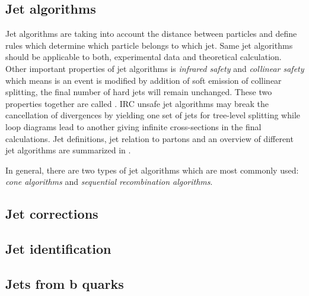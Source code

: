 
\subsection{Jet algorithms}

Jet algorithms are taking into account the distance between particles and define rules which determine which particle belongs to which jet. Same jet algorithms should be applicable to both, experimental data and theoretical calculation.  Other important properties of jet algorithms is \textit{infrared safety} and \textit{collinear safety} which means is an event is modified by addition of soft emission of collinear splitting, the final number of hard jets will remain unchanged. These two properties together are called . IRC unsafe jet algorithms may break the cancellation of divergences by yielding one set of jets for tree-level splitting while loop diagrams lead to another giving infinite cross-sections in the final calculations. Jet definitions, jet relation to partons and an overview of different jet algorithms are summarized in \cite{Salam:2009jx}.
\par In general, there are two types of jet algorithms which are most commonly used: \textit{cone algorithms} and \textit{sequential recombination algorithms}. 


\subsection{Jet corrections}




\subsection{Jet identification}


\subsection{Jets from b quarks}

